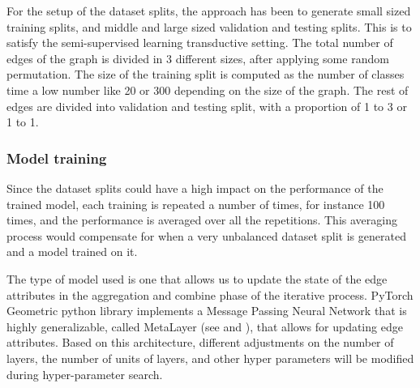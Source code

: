 
For the setup of the dataset splits, the approach has been to generate small sized training splits, and middle and large sized validation and testing splits. This is to satisfy the semi-supervised learning transductive setting. The total number of edges of the graph is divided in 3 different sizes, after applying some random permutation. The size of the training split is computed as the number of classes time a low number like 20 or 300 depending on the size of the graph. The rest of edges are divided into validation and testing split, with a proportion of 1 to 3 or 1 to 1. 




\subsubsection{Model training}

Since the dataset splits could have a high impact on the performance of the trained model, each training is repeated a number of times, for instance 100 times, and the performance is averaged over all the repetitions. This averaging process would compensate for when a very unbalanced dataset split is generated and a model trained on it.


 The type of model used is one that allows us to update the state of the edge attributes in the aggregation and combine phase of the iterative process. PyTorch Geometric python library implements a Message Passing Neural Network \cite{mpnn} that is highly generalizable, called MetaLayer (see \cite{battaglia2018relational} and \cite{fey2019fast} ), that allows for updating edge attributes. Based on this architecture, different adjustments on the number of layers, the number of units of layers, and other hyper parameters will be modified during hyper-parameter search. 



